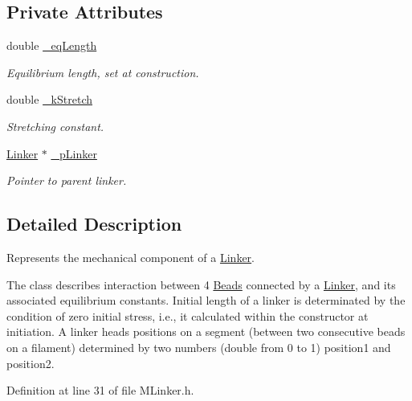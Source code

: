 \subsection*{Private Attributes}
\begin{DoxyCompactItemize}
\item 
double \hyperlink{classMLinker_a261139854320352d80c7b236bb924602}{\+\_\+eq\+Length}
\begin{DoxyCompactList}\small\item\em Equilibrium length, set at construction. \end{DoxyCompactList}\item 
double \hyperlink{classMLinker_ac42b3d84c2cd277440c052f2f80ea68c}{\+\_\+k\+Stretch}
\begin{DoxyCompactList}\small\item\em Stretching constant. \end{DoxyCompactList}\item 
\hyperlink{classLinker}{Linker} $\ast$ \hyperlink{classMLinker_abf4cccf6a06de78c9856c13c903c8edd}{\+\_\+p\+Linker}
\begin{DoxyCompactList}\small\item\em Pointer to parent linker. \end{DoxyCompactList}\end{DoxyCompactItemize}


\subsection{Detailed Description}
Represents the mechanical component of a \hyperlink{classLinker}{Linker}. 

The class describes interaction between 4 \hyperlink{classBead}{Beads} connected by a \hyperlink{classLinker}{Linker}, and its associated equilibrium constants. Initial length of a linker is determinated by the condition of zero initial stress, i.\+e., it calculated within the constructor at initiation. A linker heads positions on a segment (between two consecutive beads on a filament) determined by two numbers (double from 0 to 1) position1 and position2. 

Definition at line 31 of file M\+Linker.\+h.



